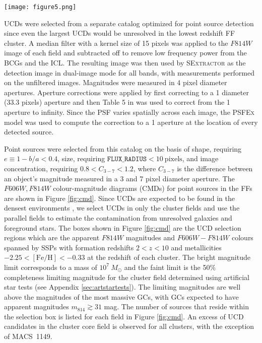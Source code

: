 \documentclass[iop,tighten,twocolumn,apj,floatfix]{emulateapj}
\begin{document}
\begin{figure*}
	\texttt{[image: figure5.png]}
	\caption{
    \label{fig:cmd}
    Colour-magnitude diagrams for unresolved sources in each of the cluster
    (left panels) and parallel (right) fields.
    The boxes are the UCD selection regions, described in the text. 
    The numbers in the top right are the total number of UCD candidates in
    each field.
    UCDs are expected to be found in the densest regions so the parallel
    fields are used to estimate the contamination from unresolved galaxies and
    foreground Milky Way stars.
	}
\end{figure*}

UCDs were selected from a separate catalog optimized for point source
detection since even the largest UCDs \citetext{$r_h \sim 100~\mathrm{pc}$,
\citealp{brodie2011}} would be
unresolved in the lowest redshift FF cluster.
A median filter with a kernel size of 15 pixels was applied to the $F814W$
image of each field and subtracted off to remove low frequency power from the
BCGs and the ICL.
The resulting image was then used by \textsc{SExtractor} as the detection
image in dual-image mode for all bands, with measurements performed on the
unfiltered images.
Magnitudes were measured in 4 pixel diameter apertures.
Aperture corrections were applied by first correcting to a 1{\arcsec} diameter
(33.3 pixels) aperture and then Table 5 in \cite{sirianni2005} was used to
correct from the 1{\arcsec} aperture to infinity.
Since the PSF varies spatially across each image, the \textsc{PSFEx} model was
used to compute the correction to a 1{\arcsec} aperture at the location of
every detected source.

Point sources were selected from this catalog on the basis of shape,
requiring $e \equiv 1-b/a < 0.4$, size, requiring $\mathtt{FLUX\_RADIUS} <
10~\mathrm{pixels}$, and image concentration, requiring $0.8 < C_{3-7} <
1.2$, where $C_{3-7}$ is the difference between an object's magnitude measured
in a 3 and 7 pixel diameter aperture.
The $F606W,F814W$ colour-magnitude diagrams (CMDs) for point sources in the
FFs are shown in Figure \ref{fig:cmd}.
Since UCDs are expected to be found in the densest environments
\citep{pfeffer2013}, we select UCDs in only the cluster fields and use the
parallel fields to estimate the contamination from unresolved galaxies and
foreground stars.
The boxes shown in Figure \ref{fig:cmd} are the UCD selection regions which
are the apparent $F814W$ magnitudes and $F606W-F814W$ colours spanned by SSPs
with formation redshifts $2 < z < 10$ and metallicities $-2.25 <
[\mathrm{Fe}/\mathrm{H}] < -0.33$ at the redshift of each cluster.
The bright magnitude limit corresponds to a mass of $10^7~M_{\odot}$ and
the faint limit is the 50\% completeness limiting magnitude for the cluster field
determined using artificial star tests (see Appendix \ref{sec:artstartests}).
The limiting magnitudes are well above the magnitudes of the most
massive GCs, with GCs expected to have apparent magnitudes $m_{814} \gtrsim
31$ mag. 
The number of sources that reside within the selection box is listed for each
field in Figure \ref{fig:cmd}.
An excess of UCD candidates in the cluster core field is observed for all
clusters, with the exception of MACS~1149.
\end{document}

